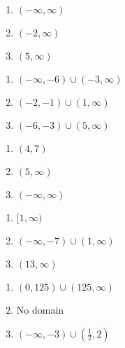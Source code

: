 \documentclass{ximera}
\begin{document}
\begin{multicols}{3}
\begin{enumerate}
\setcounter{enumi}{\value{HW}}


\item $(-\infty, \infty)$
\item $(-2, \infty)$
\item $(5, \infty)$

\setcounter{HW}{\value{enumi}}
\end{enumerate}
\end{multicols}


\begin{multicols}{3}
\begin{enumerate}
\setcounter{enumi}{\value{HW}}


\item $(-\infty, -6) \cup (-3, \infty)$
\item $(-2, -1) \cup (1, \infty)$
\item $(-6,-3) \cup (5, \infty)$

\setcounter{HW}{\value{enumi}}
\end{enumerate}
\end{multicols}


\begin{multicols}{3}
\begin{enumerate}
\setcounter{enumi}{\value{HW}}


\item $(4, 7)$
\item $(5, \infty)$
\item $(-\infty, \infty)$

\setcounter{HW}{\value{enumi}}
\end{enumerate}
\end{multicols}


\begin{multicols}{3}
\begin{enumerate}
\setcounter{enumi}{\value{HW}}


\item $[1, \infty)$
\item $(-\infty, -7) \cup (1, \infty)$
\item $(13, \infty)$

\setcounter{HW}{\value{enumi}}
\end{enumerate}
\end{multicols}


\begin{multicols}{3}
\begin{enumerate}
\setcounter{enumi}{\value{HW}}


\item $(0, 125) \cup (125, \infty)$
\item No domain
\item $(-\infty, -3) \cup \left(\frac{1}{2}, 2\right)$

\setcounter{HW}{\value{enumi}}
\end{enumerate}
\end{multicols}
\end{document}
